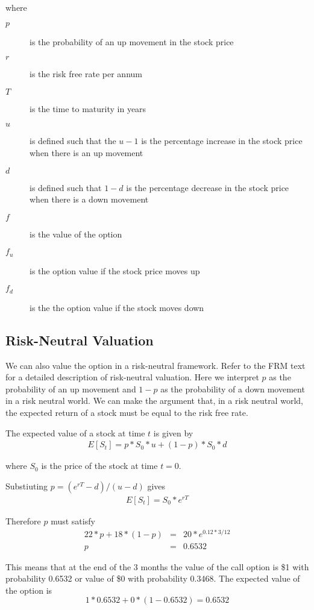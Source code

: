 \documentclass{article}\usepackage[]{graphicx}\usepackage[]{color}
\begin{document}
where
\begin{description}
  \item[$p$] is the probability of an up movement in the stock price
  \item[$r$] is the risk free rate per annum
  \item[$T$] is the time to maturity in years
  \item[$u$] is defined such that the $u-1$ is the percentage increase in the stock price when there is an up movement
  \item[$d$] is defined such that $1-d$ is the percentage decrease in the stock price when there is a down movement
  \item[$f$] is the value of the option
  \item[$f_u$] is the option value if the stock price moves up
  \item[$f_d$] is the the option value if the stock moves down
\end{description}

\subsection{Risk-Neutral Valuation}
We can also value the option in a risk-neutral framework. Refer to the FRM text for a detailed description of risk-neutral valuation. Here we interpret $p$ as the probability of an up movement and $1 - p$ as the probability of a down movement in a risk neutral world. We can make the argument that, in a risk neutral world, the expected return of a stock must be equal to the risk free rate.

The expected value of a stock at time $t$ is given by
\begin{eqnarray*}
E[S_t] = p * S_0 * u + (1 - p) * S_0 * d
\end{eqnarray*}

where $S_0$ is the price of the stock at time $t=0$.

Substiuting $p = (e^{rT} - d) / (u - d)$ gives
\begin{eqnarray*}
E[S_t] = S_0 *e^{rT}
\end{eqnarray*}

Therefore $p$ must satisfy
\begin{eqnarray*}
22 * p + 18 * (1 - p) &=& 20 * e^{0.12 * 3 / 12}\\
p &=& 0.6532
\end{eqnarray*}

This means that at the end of the 3 months the value of the call option is \$1 with probability 0.6532 or value of \$0 with probability 0.3468. The expected value of the option is
\begin{equation*}
1 * 0.6532 + 0 * (1 - 0.6532) = 0.6532
\end{equation*}
\end{document}
